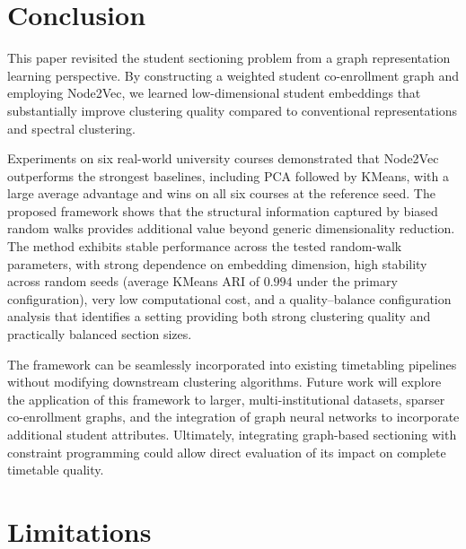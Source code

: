 \documentclass[pdflatex,sn-mathphys-num,iicol]{sn-jnl}%
\theoremstyle{thmstyleone}%
\theoremstyle{thmstyletwo}%
\theoremstyle{thmstylethree}%
\begin{document}
\section{Conclusion}
\label{sec:conclusion}

This paper revisited the student sectioning problem from a graph representation learning perspective. By constructing a weighted student co-enrollment graph and employing Node2Vec, we learned low-dimensional student embeddings that substantially improve clustering quality compared to conventional representations and spectral clustering.

Experiments on six real-world university courses demonstrated that Node2Vec outperforms the strongest baselines, including PCA followed by KMeans, with a large average advantage and wins on all six courses at the reference seed. The proposed framework shows that the structural information captured by biased random walks provides additional value beyond generic dimensionality reduction. The method exhibits stable performance across the tested random-walk parameters, with strong dependence on embedding dimension, high stability across random seeds (average KMeans ARI of $0.994$ under the primary configuration), very low computational cost, and a quality--balance configuration analysis that identifies a setting providing both strong clustering quality and practically balanced section sizes.

The framework can be seamlessly incorporated into existing timetabling pipelines without modifying downstream clustering algorithms. Future work will explore the application of this framework to larger, multi-institutional datasets, sparser co-enrollment graphs, and the integration of graph neural networks to incorporate additional student attributes. Ultimately, integrating graph-based sectioning with constraint programming could allow direct evaluation of its impact on complete timetable quality.



\section{Limitations}
\end{document}
